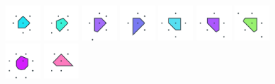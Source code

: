 \documentclass[text.tex]{subfiles}
\begin{document}
\begin{figure}[h!]
\includegraphics[width=0.12\textwidth]{img/results/octagon/octagon_109619_(-27_13alpha_4)_005.pdf}
\includegraphics[width=0.12\textwidth]{img/results/octagon/octagon_109619_(-27_13alpha_4)_006.pdf}
\includegraphics[width=0.12\textwidth]{img/results/octagon/octagon_109619_(-27_13alpha_4)_007.pdf}
\includegraphics[width=0.12\textwidth]{img/results/octagon/octagon_109619_(-27_13alpha_4)_008.pdf}
\includegraphics[width=0.12\textwidth]{img/results/octagon/octagon_109619_(-27_13alpha_4)_009.pdf}
\includegraphics[width=0.12\textwidth]{img/results/octagon/octagon_109619_(-27_13alpha_4)_010.pdf}
\includegraphics[width=0.12\textwidth]{img/results/octagon/octagon_109619_(-27_13alpha_4)_011.pdf}
\includegraphics[width=0.12\textwidth]{img/results/octagon/octagon_109619_(-27_13alpha_4)_012.pdf}
\includegraphics[width=0.12\textwidth]{img/results/octagon/octagon_109619_(-27_13alpha_4)_013.pdf}

\end{figure}
\end{document}
